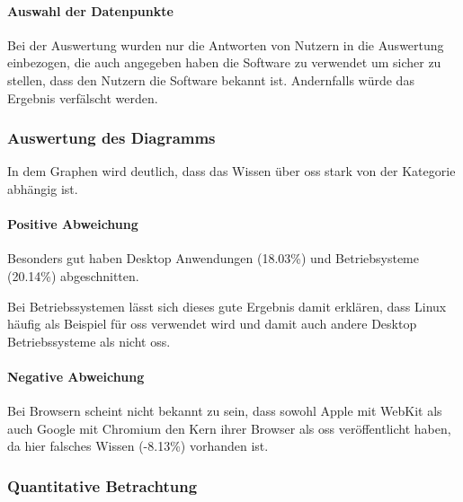 \documentclass[a4paper]{article}
\begin{document}
                \paragraph{Auswahl der Datenpunkte}
                    Bei der Auswertung wurden nur die Antworten von Nutzern in die Auswertung einbezogen, die auch angegeben haben die Software zu verwendet um sicher zu stellen, dass den Nutzern die Software bekannt ist. Andernfalls würde das Ergebnis verfälscht werden.
                    
            \subsubsection{Auswertung des Diagramms}
                In dem Graphen wird deutlich, dass das Wissen über \gls{oss} stark von der Kategorie abhängig ist.
                
                \paragraph{Positive Abweichung}
                    Besonders gut haben Desktop Anwendungen ({\scriptsize 18.03\%}) und Betriebsysteme ({\scriptsize 20.14\%}) abgeschnitten.
                    
                    Bei Betriebssystemen lässt sich dieses gute Ergebnis damit erklären, dass Linux häufig als Beispiel für \gls{oss} verwendet wird und damit auch andere Desktop Betriebssysteme als nicht \gls{oss}.%
                    
                
                \paragraph{Negative Abweichung}
                    Bei Browsern scheint nicht bekannt zu sein, dass sowohl Apple mit WebKit als auch Google mit Chromium den Kern ihrer Browser als \gls{oss} veröffentlicht haben, da hier falsches Wissen ({\scriptsize -8.13\%}) vorhanden ist. %
                    
            
            \subsubsection{Quantitative Betrachtung}
            
\end{document}
